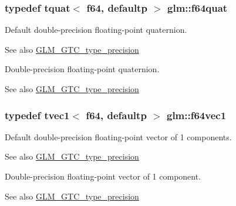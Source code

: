 \subsubsection[{f64quat}]{\setlength{\rightskip}{0pt plus 5cm}typedef tquat$<$ f64, defaultp $>$ {\bf glm\+::f64quat}}\label{group__gtc__type__precision_ga5b54d7b36fbee5e271f73e6ed74e7172}
Default double-\/precision floating-\/point quaternion. \begin{DoxySeeAlso}{See also}
\hyperlink{group__gtc__type__precision}{G\+L\+M\+\_\+\+G\+T\+C\+\_\+type\+\_\+precision}
\end{DoxySeeAlso}
Double-\/precision floating-\/point quaternion. \begin{DoxySeeAlso}{See also}
\hyperlink{group__gtc__type__precision}{G\+L\+M\+\_\+\+G\+T\+C\+\_\+type\+\_\+precision} 
\end{DoxySeeAlso}
\hypertarget{group__gtc__type__precision_ga4c945cd13adbebd25ea3df003efb92ef}{}
\subsubsection[{f64vec1}]{\setlength{\rightskip}{0pt plus 5cm}typedef tvec1$<$ f64, defaultp $>$ {\bf glm\+::f64vec1}}\label{group__gtc__type__precision_ga4c945cd13adbebd25ea3df003efb92ef}
Default double-\/precision floating-\/point vector of 1 components. \begin{DoxySeeAlso}{See also}
\hyperlink{group__gtc__type__precision}{G\+L\+M\+\_\+\+G\+T\+C\+\_\+type\+\_\+precision}
\end{DoxySeeAlso}
Double-\/precision floating-\/point vector of 1 component. \begin{DoxySeeAlso}{See also}
\hyperlink{group__gtc__type__precision}{G\+L\+M\+\_\+\+G\+T\+C\+\_\+type\+\_\+precision} 
\end{DoxySeeAlso}
\hypertarget{group__gtc__type__precision_gacde4fe7b129521888cd30672c34650c5}{}
